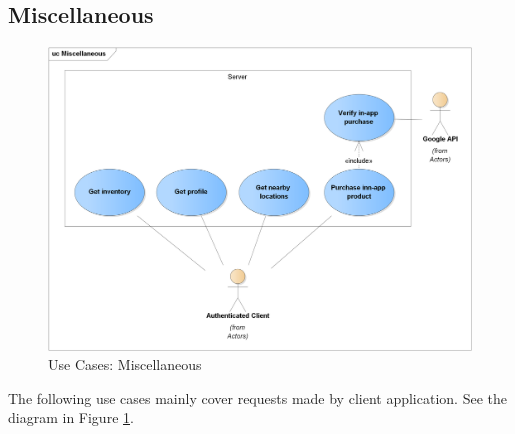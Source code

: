 	\subsection{Miscellaneous}
	\begin{figure}[h]	
		\includegraphics[width=\textwidth]{figures/UC_Miscellaneous}
		\centering			
		\caption{Use Cases: Miscellaneous}
		\label{fig:ucmisc}
	\end{figure}
	The following use cases mainly cover requests made by client application. See the diagram in Figure \ref{fig:ucmisc}.
